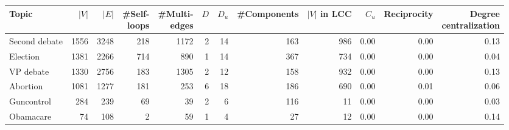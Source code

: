 \begin{tabular}{lrrrrrrrrrrr}
\toprule
           Topic &  $|V|$ &  $|E|$ &  \makecell{\#Self-\\ loops} &  \makecell{\#Multi-\\ edges} &  $D$ &  $D_u$ &  \#Components &  \makecell{$|V|$\\ in LCC} &  $C_u$ &  Reciprocity &  \makecell{Degree\\ centralization} \\
\midrule
    Second debate &   1556 &   3248 &                         218 &                         1172 &    2 &     14 &           163 &                        986 &   0.00 &         0.00 &                                0.13 \\
  Election &   1381 &   2266 &                         714 &                          890 &    1 &     14 &           367 &                        734 &   0.00 &         0.00 &                                0.04 \\
        VP debate &   1330 &   2756 &                         183 &                         1305 &    2 &     12 &           158 &                        932 &   0.00 &         0.00 &                                0.13 \\
  Abortion &   1081 &   1277 &                         181 &                          253 &    6 &     18 &           186 &                        690 &   0.00 &         0.01 &                                0.06 \\
Guncontrol &    284 &    239 &                          69 &                           39 &    2 &      6 &           116 &                         11 &   0.00 &         0.00 &                                0.03 \\
     Obamacare &     74 &    108 &                           2 &                           59 &    1 &      4 &            27 &                         12 &   0.00 &         0.00 &                                0.14 \\
\bottomrule

\end{tabular}

